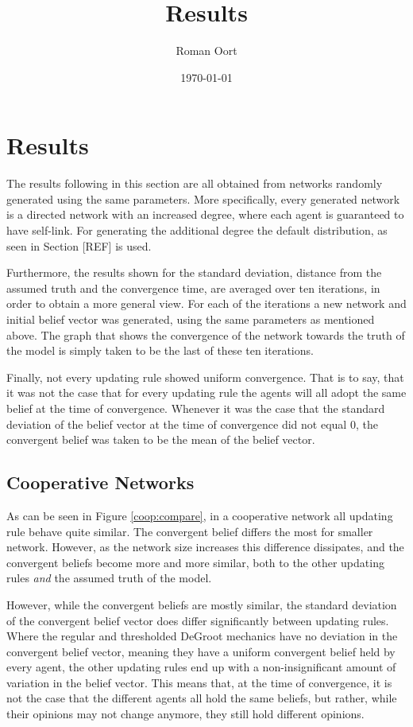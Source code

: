 \documentclass{article}
\title{Results}
\author{Roman Oort}
\date{\today}
\begin{document}
\maketitle

\tableofcontents
\newpage
\section{Results}
\label{results}

The results following in this section are all obtained from networks randomly generated using the same parameters. More specifically, every generated network is a directed network with an increased degree, where each agent is guaranteed to have self-link. For generating the additional degree the default distribution, as seen in Section [REF] is used.

\noindent Furthermore, the results shown for the standard deviation, distance from the assumed truth and the convergence time, are averaged over ten iterations, in order to obtain a more general view. For each of the iterations a new network and initial belief vector was generated, using the same parameters as mentioned above. The graph that shows the convergence of the network towards the truth of the model is simply taken to be the last of these ten iterations.

\noindent Finally, not every updating rule showed uniform convergence. That is to say, that it was not the case that for every updating rule the agents will all adopt the same belief at the time of convergence. Whenever it was the case that the standard deviation of the belief vector at the time of convergence did not equal $0$, the convergent belief was taken to be the mean of the belief vector.

\subsection{Cooperative Networks}

As can be seen in Figure \ref{coop:compare}, in a cooperative network all updating rule behave quite similar. The convergent belief differs the most for smaller network. However, as the network size increases this difference dissipates, and the convergent beliefs become more and more similar, both to the other updating rules \emph{and} the assumed truth of the model.

\noindent However, while the convergent beliefs are mostly similar, the standard deviation of the convergent belief vector does differ significantly between updating rules. Where the regular and thresholded DeGroot mechanics have no deviation in the convergent belief vector, meaning they have a uniform convergent belief held by every agent, the other updating rules end up with a non-insignificant amount of variation in the belief vector. This means that, at the time of convergence, it is not the case that the different agents all hold the same beliefs, but rather, while their opinions may not change anymore, they still hold different opinions. 
\end{document}
